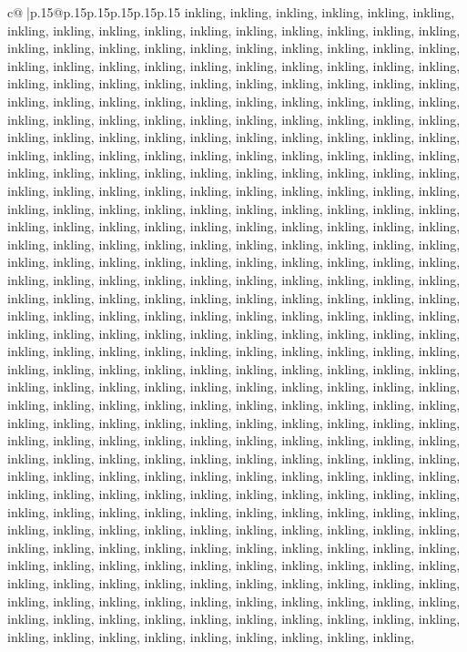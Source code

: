 \documentclass{article}
\begin{document}
{\begin{supertabular}{c@{$\;$}|p{.15\linewidth}@{}p{.15\linewidth}p{.15\linewidth}p{.15\linewidth}p{.15\linewidth}p{.15\linewidth}}
{{{inkling, inkling, inkling, inkling, inkling, inkling, inkling, inkling, inkling, inkling, inkling, inkling, inkling, inkling, inkling, inkling, inkling, inkling, inkling, inkling, inkling, inkling, inkling, inkling, inkling, inkling, inkling, inkling, inkling, inkling, inkling, inkling, inkling, inkling, inkling, inkling, inkling, inkling, inkling, inkling, inkling, inkling, inkling, inkling, inkling, inkling, inkling, inkling, inkling, inkling, inkling, inkling, inkling, inkling, inkling, inkling, inkling, inkling, inkling, inkling, inkling, inkling, inkling, inkling, inkling, inkling, inkling, inkling, inkling, inkling, inkling, inkling, inkling, inkling, inkling, inkling, inkling, inkling, inkling, inkling, inkling, inkling, inkling, inkling, inkling, inkling, inkling, inkling, inkling, inkling, inkling, inkling, inkling, inkling, inkling, inkling, inkling, inkling, inkling, inkling, inkling, inkling, inkling, inkling, inkling, inkling, inkling, inkling, inkling, inkling, inkling, inkling, inkling, inkling, inkling, inkling, inkling, inkling, inkling, inkling, inkling, inkling, inkling, inkling, inkling, inkling, inkling, inkling, inkling, inkling, inkling, inkling, inkling, inkling, inkling, inkling, inkling, inkling, inkling, inkling, inkling, inkling, inkling, inkling, inkling, inkling, inkling, inkling, inkling, inkling, inkling, inkling, inkling, inkling, inkling, inkling, inkling, inkling, inkling, inkling, inkling, inkling, inkling, inkling, inkling, inkling, inkling, inkling, inkling, inkling, inkling, inkling, inkling, inkling, inkling, inkling, inkling, inkling, inkling, inkling, inkling, inkling, inkling, inkling, inkling, inkling, inkling, inkling, inkling, inkling, inkling, inkling, inkling, inkling, inkling, inkling, inkling, inkling, inkling, inkling, inkling, inkling, inkling, inkling, inkling, inkling, inkling, inkling, inkling, inkling, inkling, inkling, inkling, inkling, inkling, inkling, inkling, inkling, inkling, inkling, inkling, inkling, inkling, inkling, inkling, inkling, inkling, inkling, inkling, inkling, inkling, inkling, inkling, inkling, inkling, inkling, inkling, inkling, inkling, inkling, inkling, inkling, inkling, inkling, inkling, inkling, inkling, inkling, inkling, inkling, inkling, inkling, inkling, inkling, inkling, inkling, inkling, inkling, inkling, inkling, inkling, inkling, inkling, inkling, inkling, inkling, inkling, inkling, inkling, inkling, inkling, inkling, inkling, inkling, inkling, inkling, inkling, inkling, inkling, inkling, inkling, inkling, inkling, inkling, inkling, inkling, inkling, inkling, inkling, inkling, inkling, inkling, inkling, inkling, inkling, inkling, inkling, inkling, inkling, inkling, inkling, inkling, inkling, inkling, inkling, inkling, inkling, inkling, inkling, inkling, inkling, inkling, inkling, inkling, inkling, inkling, inkling, inkling, inkling, inkling, inkling, inkling, inkling, inkling, inkling, inkling, inkling, inkling, inkling, inkling, inkling, inkling, inkling, inkling, inkling, inkling, inkling, inkling, inkling, inkling, inkling, inkling, inkling, inkling, inkling, inkling, inkling, inkling, inkling, inkling, inkling, inkling, inkling, inkling, inkling, }}}
\end{supertabular}}
\end{document}
